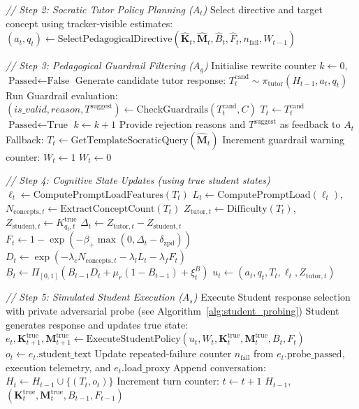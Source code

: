 \documentclass[11pt,a4paper]{report}
\begin{document}
\begin{algorithm}[p]
\begin{algorithmic}[1]
    \State \textit{// Step 2: Socratic Tutor Policy Planning ($A_t$)}
    \State Select directive and target concept using tracker-visible estimates:
    \State $(a_t,q_t) \gets \text{SelectPedagogicalDirective}(\hat{\mathbf{K}}_t,\hat{\mathbf{M}}_t,\hat{B}_t,\hat{F}_t,n_{\text{fail}},W_{t-1})$
    
    \State \textit{// Step 3: Pedagogical Guardrail Filtering ($A_g$)}
    \State Initialise rewrite counter $k \gets 0$, $\text{Passed} \gets \text{False}$
        \State Generate candidate tutor response: $T^{\text{cand}}_t \sim \pi_{\text{tutor}}(H_{t-1}, a_t, q_t)$
        \State Run Guardrail evaluation: $(is\_valid, reason, T^{\text{suggest}}) \gets \text{CheckGuardrails}(T^{\text{cand}}_t, C)$
            \State $T_t \gets T^{\text{cand}}_t$
            \State $\text{Passed} \gets \text{True}$
        \Else
            \State $k \gets k + 1$
            \State Provide rejection reasons and $T^{\text{suggest}}$ as feedback to $A_t$
        \EndIf
    \EndWhile
        \State Fallback: $T_t \gets \text{GetTemplateSocraticQuery}(\hat{\mathbf{M}}_t)$
        \State Increment guardrail warning counter: $W_t \gets 1$
    \Else
        \State $W_t \gets 0$
    \EndIf
    
    \State \textit{// Step 4: Cognitive State Updates (using true student states)}
    \State $\ell_t \gets \text{ComputePromptLoadFeatures}(T_t)$
    \State $L_t \gets \text{ComputePromptLoad}(\ell_t)$, \quad
           $N_{\text{concepts},t}\gets\text{ExtractConceptCount}(T_t)$
    \State $Z_{\text{tutor},t}\gets\text{Difficulty}(T_t)$, \quad
           $Z_{\text{student},t}\gets K^{\text{true}}_{q_t,t}$
    \State $\Delta_t\gets Z_{\text{tutor},t}-Z_{\text{student},t}$
    \State $F_t \gets 1-\exp(-\beta_+\max(0,\Delta_t-\delta_{\text{zpd}}))$
    \State $D_t\gets\exp(-\lambda_cN_{\text{concepts},t}-\lambda_lL_t-\lambda_fF_t)$
    \State $B_t\gets\Pi_{[0,1]}(B_{t-1}D_t+\mu_r(1-B_{t-1})+\xi_t^B)$
    \State $u_t\gets(a_t,q_t,T_t,\ell_t,Z_{\text{tutor},t})$
    
    \State \textit{// Step 5: Simulated Student Execution ($A_s$)}
    \State Execute Student response selection with private adversarial probe (see Algorithm~\ref{alg:student_probing})
    \State Student generates response and updates true state:
    \State $e_t, \mathbf{K}_{t+1}^{\text{true}}, \mathbf{M}_{t+1}^{\text{true}} \gets \text{ExecuteStudentPolicy}(u_t,W_t,\mathbf{K}_t^{\text{true}},\mathbf{M}_t^{\text{true}},B_t,F_t)$
    \State $o_t \gets e_t.\text{student\_text}$
    \State Update repeated-failure counter $n_{\text{fail}}$ from $e_t.\text{probe\_passed}$, execution telemetry, and $e_t.\text{load\_proxy}$
    \State Append conversation: $H_t \gets H_{t-1} \cup \{(T_t, o_t)\}$
    \State Increment turn counter: $t \gets t + 1$
\EndWhile
\State \Return $H_{t-1}$, $(\mathbf{K}_{t}^{\text{true}}, \mathbf{M}_{t}^{\text{true}}, B_{t-1}, F_{t-1})$
\end{algorithmic}
\end{algorithm}
\end{document}
